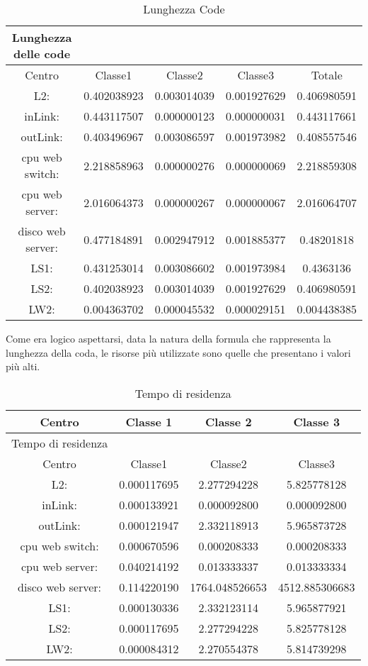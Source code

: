 \begin{table}[htbp]
\begin{center}
\begin{tabular}{|c|c|c|c|c|}
\hline
Lunghezza delle code\\
\hline
Centro &Classe1 &Classe2 &Classe3 &Totale\\
\hline
\hline
L2: &0.402038923 &0.003014039 &0.001927629 &0.406980591\\
\hline
inLink: &0.443117507 &0.000000123 &0.000000031 &0.443117661\\
\hline
outLink: &0.403496967 &0.003086597 &0.001973982 &0.408557546\\
\hline
cpu web switch: &2.218858963 &0.000000276 &0.000000069 &2.218859308\\
\hline
cpu web server: &2.016064373  &0.000000267 &0.000000067 &2.016064707\\
\hline
disco web server: &0.477184891 &0.002947912 &0.001885377 &0.48201818\\
\hline
LS1: &0.431253014 &0.003086602 &0.001973984 &0.4363136\\
\hline
LS2: &0.402038923 &0.003014039 &0.001927629 &0.406980591\\
\hline
LW2: &0.004363702 &0.000045532 &0.000029151 &0.004438385\\
\hline
\end{tabular}
\end{center}
\caption{Lunghezza Code}
\label{lunghezzacode}
\end{table}
Come era logico aspettarsi, data la natura della formula che rappresenta la lunghezza della coda, le risorse più utilizzate sono quelle che presentano i valori più alti.
\begin{table}[htbp]
\begin{center}
\begin{tabular}{|c|c|c|c|}
\hline
Centro	&Classe 1	&Classe 2	&Classe 3\\
\hline
\hline
\hline
Tempo di residenza\\
\hline
Centro &Classe1 &Classe2 &Classe3\\
\hline
\hline
L2: &0.000117695 &2.277294228 &5.825778128\\
\hline
inLink: &0.000133921 &0.000092800 &0.000092800\\
\hline
outLink: &0.000121947 &2.332118913 &5.965873728\\
\hline
cpu web switch: &0.000670596 &0.000208333 &0.000208333\\
\hline
cpu web server: &0.040214192 &0.013333337 &0.013333334\\
\hline
disco web server: &0.114220190 &1764.048526653 &4512.885306683\\
\hline
LS1: &0.000130336 &2.332123114 &5.965877921\\
\hline
LS2: &0.000117695 &2.277294228 &5.825778128\\
\hline
LW2: &0.000084312 &2.270554378 &5.814739298\\
\hline
\end{tabular}
\end{center}
\caption{Tempo di residenza}
\label{tempodiresidenza}
\end{table}
